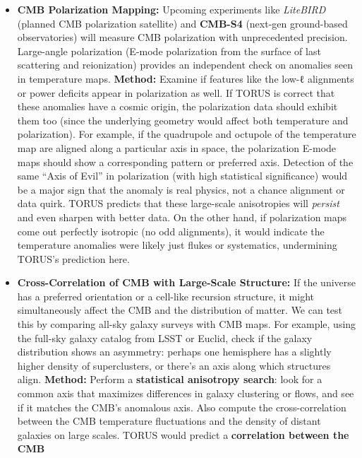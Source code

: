 \begin{itemize}
  \begin{itemize}
  \item
    \textbf{CMB Polarization Mapping:} Upcoming experiments like
    \emph{LiteBIRD} (planned CMB polarization satellite) and
    \textbf{CMB-S4} (next-gen ground-based observatories) will measure
    CMB polarization with unprecedented precision. Large-angle
    polarization (E-mode polarization from the surface of last
    scattering and reionization) provides an independent check on
    anomalies seen in temperature maps​. \textbf{Method:} Examine if
    features like the low-ℓ alignments or power deficits appear in
    polarization as well. If TORUS is correct that these anomalies have
    a cosmic origin, the polarization data should exhibit them too
    (since the underlying geometry would affect both temperature and
    polarization). For example, if the quadrupole and octupole of the
    temperature map are aligned along a particular axis in space, the
    polarization E-mode maps should show a corresponding pattern or
    preferred axis​. Detection of the same ``Axis of Evil'' in
    polarization (with high statistical significance) would be a major
    sign that the anomaly is real physics, not a chance alignment or
    data quirk​. TORUS predicts that these large-scale anisotropies will
    \emph{persist} and even sharpen with better data​. On the other
    hand, if polarization maps come out perfectly isotropic (no odd
    alignments), it would indicate the temperature anomalies were likely
    just flukes or systematics, undermining TORUS's prediction here​.
  \item
    \textbf{Cross-Correlation of CMB with Large-Scale Structure:} If the
    universe has a preferred orientation or a cell-like recursion
    structure, it might simultaneously affect the CMB and the
    distribution of matter. We can test this by comparing all-sky galaxy
    surveys with CMB maps​. For example, using the full-sky galaxy
    catalog from LSST or Euclid, check if the galaxy distribution shows
    an asymmetry: perhaps one hemisphere has a slightly higher density
    of superclusters, or there's an axis along which structures align.
    \textbf{Method:} Perform a \textbf{statistical anisotropy search}:
    look for a common axis that maximizes differences in galaxy
    clustering or flows, and see if it matches the CMB's anomalous axis.
    Also compute the cross-correlation between the CMB temperature
    fluctuations and the density of distant galaxies on large scales.
    TORUS would predict a \textbf{correlation between the CMB
}
\end{itemize}
\end{itemize}
